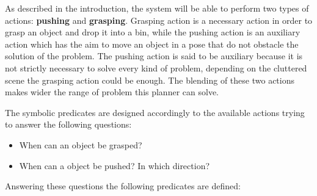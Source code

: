 As described in the introduction, the system will be able to perform two types of actions: \textbf{pushing} and \textbf{grasping}.
Grasping action is a necessary action in order to grasp an object and drop it into a bin, while the pushing action is an auxiliary action which has the aim to move an object in a pose that do not obstacle the solution of the problem. 
The pushing action is said to be auxiliary because it is not strictly necessary to solve every kind of problem, depending on the cluttered scene the grasping action could be enough.
The blending of these two actions makes wider the range of problem this planner can solve.    

The symbolic predicates are designed accordingly to the available actions trying to answer the following questions:
\begin{itemize}
\item When can an object be grasped? 
\item When can a object be pushed? In which direction? 
\end{itemize}
Answering these questions the following predicates are defined:

